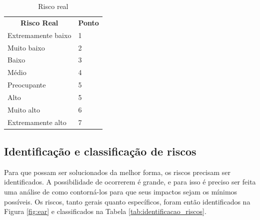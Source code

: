\begin{table}[h]
 \centering
 {\renewcommand\arraystretch{1.25}
 \caption{Risco real} \label{tab:risco_real}
 \begin{tabular}{ l l }
  \cline{1-1}\cline{2-2}  
    \multicolumn{1}{|c|}{\textbf{Risco Real} \centering } &
    \multicolumn{1}{c|}{\textbf{Ponto} \centering }
  \\  
  \cline{1-1}\cline{2-2}  
    \multicolumn{1}{|p{3.850cm}|}{Extremamente baixo \centering } &
    \multicolumn{1}{p{4.217cm}|}{1 \centering }
  \\  
  \cline{1-1}\cline{2-2}  
    \multicolumn{1}{|p{3.850cm}|}{Muito baixo \centering } &
    \multicolumn{1}{p{4.217cm}|}{2 \centering }
  \\  
  \cline{1-1}\cline{2-2}  
    \multicolumn{1}{|p{3.850cm}|}{Baixo \centering } &
    \multicolumn{1}{p{4.217cm}|}{3 \centering }
  \\  
  \cline{1-1}\cline{2-2}  
    \multicolumn{1}{|p{3.850cm}|}{Médio \centering } &
    \multicolumn{1}{p{4.217cm}|}{4 \centering }
  \\  
  \cline{1-1}\cline{2-2}  
    \multicolumn{1}{|p{3.850cm}|}{Preocupante \centering } &
    \multicolumn{1}{p{4.217cm}|}{5 \centering }
  \\  
  \cline{1-1}\cline{2-2}  
    \multicolumn{1}{|p{3.850cm}|}{Alto \centering } &
    \multicolumn{1}{p{4.217cm}|}{5 \centering }
  \\  
  \cline{1-1}\cline{2-2}  
    \multicolumn{1}{|p{3.850cm}|}{Muito alto \centering } &
    \multicolumn{1}{p{4.217cm}|}{6 \centering }
  \\  
  \cline{1-1}\cline{2-2}  
    \multicolumn{1}{|p{3.850cm}|}{Extremamente alto \centering } &
    \multicolumn{1}{p{4.217cm}|}{7 \centering }
  \\  
  \hline

 \end{tabular} }
\end{table}

\subsection{Identificação e classificação de riscos}
Para que possam ser solucionados da melhor forma, os riscos precisam ser identificados. A possibilidade de ocorrerem é grande, e para isso é preciso ser feita uma análise de como contorná-los para que seus impactos sejam os mínimos possíveis. Os riscos, tanto gerais quanto específicos, foram então identificados na Figura \ref{fig:ear} e classificados na Tabela \ref{tab:identificacao_riscos}.

